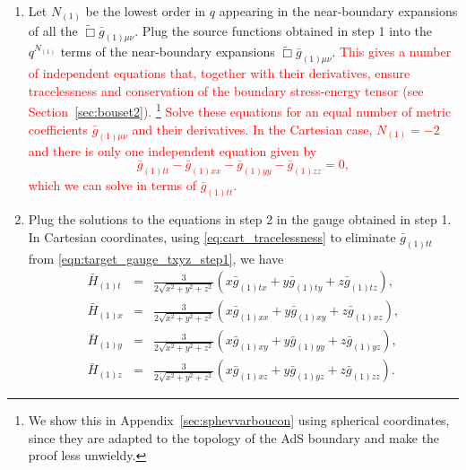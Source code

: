 \documentclass[a4paper,11pt]{article}
\numberwithin{equation}{section}
\begin{document}
\begin{enumerate}
\item Let $N_{(1)}$ be the lowest order in $q$ appearing in the near-boundary expansions of all the $\tilde{\Box}\bar{g}_{(1)\mu\nu}$. Plug the source functions obtained in step 1 into the $q^{N_{(1)}}$ terms of the near-boundary expansions $\tilde{\Box}\bar{g}_{(1)\mu\nu}$.
\textcolor{red}{This gives a number of independent equations that, together with their derivatives, ensure tracelessness and conservation of the boundary stress-energy tensor (see  Section~\ref{sec:bouset2}).
\footnote{We show this in Appendix~\ref{sec:sphevvarboucon} using spherical coordinates, since they are adapted to the topology of the AdS boundary and make the proof less unwieldy.}}
\textcolor{red}{Solve these equations for an equal number of metric coefficients $\bar g_{(1)\mu\nu}$ and their derivatives.
In the Cartesian case, $N_{(1)}=-2$ and there is only one independent equation given by
\begin{equation}
\label{eq:cart_tracelessness}
\bar{g}_{(1)tt}-\bar{g}_{(1)xx}-\bar{g}_{(1)yy}-\bar{g}_{(1)zz}=0,
\end{equation}
which we can solve in terms of $\bar g_{(1)tt}$.
}

\item Plug the solutions to the equations in step 2 in the gauge obtained in step 1.
In Cartesian coordinates, using \eqref{eq:cart_tracelessness} to eliminate $\bar{g}_{(1)tt}$ from \eqref{eqn:target_gauge_txyz_step1}, we have
\begin{eqnarray}\label{eqn:target_gauge_txyz}
\bar{H}_{(1)t}&=&\frac{3}{2\sqrt{x^2+y^2+z^2}}(x \bar{g}_{(1)tx}+y\bar{g}_{(1)ty}+z\bar{g}_{(1)tz}),\nonumber\\
\bar{H}_{(1)x}&=&\frac{3}{2\sqrt{x^2+y^2+z^2}}(x \bar{g}_{(1)xx}+y\bar{g}_{(1)xy}+z\bar{g}_{(1)xz}), \nonumber \\
\bar{H}_{(1)y}&=&\frac{3}{2\sqrt{x^2+y^2+z^2}}(x \bar{g}_{(1)xy}+y\bar{g}_{(1)yy}+z\bar{g}_{(1)yz}), \nonumber \\
\bar{H}_{(1)z}&=&\frac{3}{2\sqrt{x^2+y^2+z^2}}(x \bar{g}_{(1)xz}+y\bar{g}_{(1)yz}+z\bar{g}_{(1)zz}).
\end{eqnarray}
\end{enumerate}
\end{document}
